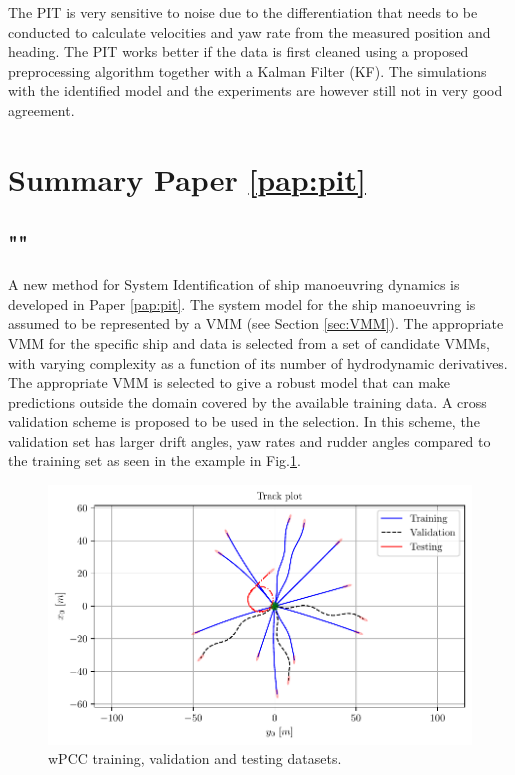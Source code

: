 \noindent The PIT is very sensitive to noise due to the differentiation that needs to be conducted to calculate velocities and yaw rate from the measured position and heading. The PIT works better if the data is first cleaned using a proposed preprocessing algorithm together with a Kalman Filter (KF). The simulations with the identified model and the experiments are however still not in very good agreement.     

\section{Summary Paper \ref{pap:pit}}
\subsection*{""}
A new method for System Identification of ship manoeuvring dynamics is developed in Paper \ref{pap:pit}. The system model for the ship manoeuvring is assumed to be represented by a VMM (see Section \ref{sec:VMM}). The appropriate VMM for the specific ship and data is selected from a set of candidate VMMs, with varying complexity as a function of its number of hydrodynamic derivatives. The appropriate VMM is selected to give a robust model that can make predictions outside the domain covered by the available training data. A cross validation scheme is proposed to be used in the selection. In this scheme, the validation set has larger drift angles, yaw rates and rudder angles compared to the training set as seen in the example in Fig.\ref{fig:cross_validation}.
\begin{figure}[H]
    \centering
    \includegraphics[width=\linewidth]{kappa/images/3.pdf}
    \caption{wPCC training, validation and testing datasets.}
    \label{fig:cross_validation}
\end{figure}
